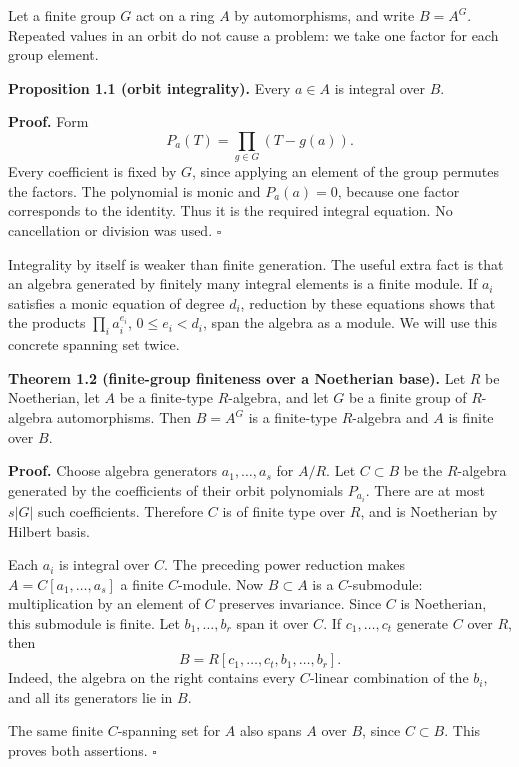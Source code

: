 \documentclass[
]{article}
\begin{document}
Let a finite group \(G\) act on a ring \(A\) by automorphisms, and write
\(B=A^G\). Repeated values in an orbit do not cause a problem: we take
one factor for each group element.

\protect{}\label{proposition-1-1}{}

\textbf{Proposition 1.1 (orbit integrality).} Every \(a\in A\) is
integral over \(B\).

\textbf{Proof.} Form \[
P_a(T)=\prod_{g\in G}(T-g(a)).
\] Every coefficient is fixed by \(G\), since applying an element of the
group permutes the factors. The polynomial is monic and \(P_a(a)=0\),
because one factor corresponds to the identity. Thus it is the required
integral equation. No cancellation or division was used. \(\square\)

Integrality by itself is weaker than finite generation. The useful extra
fact is that an algebra generated by finitely many integral elements is
a finite module. If \(a_i\) satisfies a monic equation of degree
\(d_i\), reduction by these equations shows that the products
\(\prod_i a_i^{e_i}\), \(0\leq e_i<d_i\), span the algebra as a module.
We will use this concrete spanning set twice.

\protect{}\label{theorem-1-2}{}

\textbf{Theorem 1.2 (finite-group finiteness over a Noetherian base).}
Let \(R\) be Noetherian, let \(A\) be a finite-type \(R\)-algebra, and
let \(G\) be a finite group of \(R\)-algebra automorphisms. Then
\(B=A^G\) is a finite-type \(R\)-algebra and \(A\) is finite over \(B\).

\textbf{Proof.} Choose algebra generators \(a_1,\ldots,a_s\) for
\(A/R\). Let \(C\subset B\) be the \(R\)-algebra generated by the
coefficients of their orbit polynomials \(P_{a_i}\). There are at most
\(s|G|\) such coefficients. Therefore \(C\) is of finite type over
\(R\), and is Noetherian by Hilbert basis.

Each \(a_i\) is integral over \(C\). The preceding power reduction makes
\(A=C [a_1,\ldots,a_s]\) a finite \(C\)-module. Now \(B\subset A\) is a
\(C\)-submodule: multiplication by an element of \(C\) preserves
invariance. Since \(C\) is Noetherian, this submodule is finite. Let
\(b_1,\ldots,b_r\) span it over \(C\). If \(c_1,\ldots,c_t\) generate
\(C\) over \(R\), then \[
B=R [c_1,\ldots,c_t,b_1,\ldots,b_r].
\] Indeed, the algebra on the right contains every \(C\)-linear
combination of the \(b_i\), and all its generators lie in \(B\).

The same finite \(C\)-spanning set for \(A\) also spans \(A\) over
\(B\), since \(C\subset B\). This proves both assertions. \(\square\)
\end{document}
